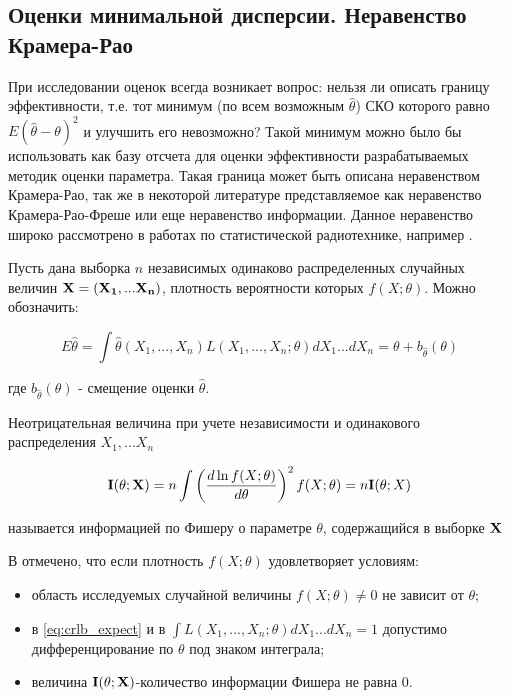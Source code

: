 \subsection{Оценки минимальной дисперсии. Неравенство Крамера-Рао}
\label{s2:crlb}

При исследовании оценок всегда возникает вопрос: нельзя ли описать границу эффективности, т.е. тот минимум (по всем возможным ${\hat \theta}$)
СКО которого равно ${E(\hat \theta -\theta)^2}$ и улучшить его невозможно? Такой минимум можно было бы использовать как базу отсчета для оценки
эффективности разрабатываемых методик оценки параметра. Такая граница может быть описана неравенством Крамера-Рао, так же в некоторой
литературе представляемое как неравенство Крамера-Рао-Фреше или еще неравенство информации. Данное неравенство широко рассмотрено в
работах по статистической радиотехнике, например \cite{aivazyan-book, levin-book, bolshakov-book}.

Пусть дана выборка ${n}$ независимых одинаково распределенных случайных величин ${\bf{X} = (X_1,...X_n)}$, плотность вероятности которых ${f(X; \theta)}$.
Можно обозначить:
\begin{center}
\begin{equation}
	\label{eq:crlb_expect}
	E \hat \theta = \int{\hat \theta} (X_1, ..., X_n)L(X_1,...,X_n;\theta)dX_1...dX_n = \theta + b_{\hat \theta}(\theta)
\end{equation}
\end{center}
где ${b_{\hat \theta}(\theta)}$ - смещение оценки ${\hat \theta}$.

Неотрицательная величина при учете независимости и одинакового распределения ${X_1,...X_n}$
\begin{center}
\begin{equation}
	\label{eq:crlb_fisher}
	{\bf I}(\theta; {\bf X}) = n \int \left( \frac{d \ln f(X;\theta)}{d \theta} \right)^2f(X;\theta)=n {\bf I} (\theta; X)
\end{equation}
\end{center}
называется информацией по Фишеру о параметре ${\theta}$, содержащийся в выборке ${\bf{X}}$

В \cite{aivazyan-book} отмечено, что если плотность ${f(X;\theta)}$ удовлетворяет условиям:
\begin{itemize}
	\item область исследуемых случайной величины ${f(X; \theta)} \ne 0$  не зависит от ${\theta}$;
	\item в \ref{eq:crlb_expect} и в ${\int L(X_1,...,X_n;\theta)dX_1...dX_n}=1$ допустимо дифференцирование по ${\theta}$ под знаком
		интеграла;
	\item величина ${\bf{I}(\theta; X)}$-количество информации Фишера не равна 0.
\end{itemize}

